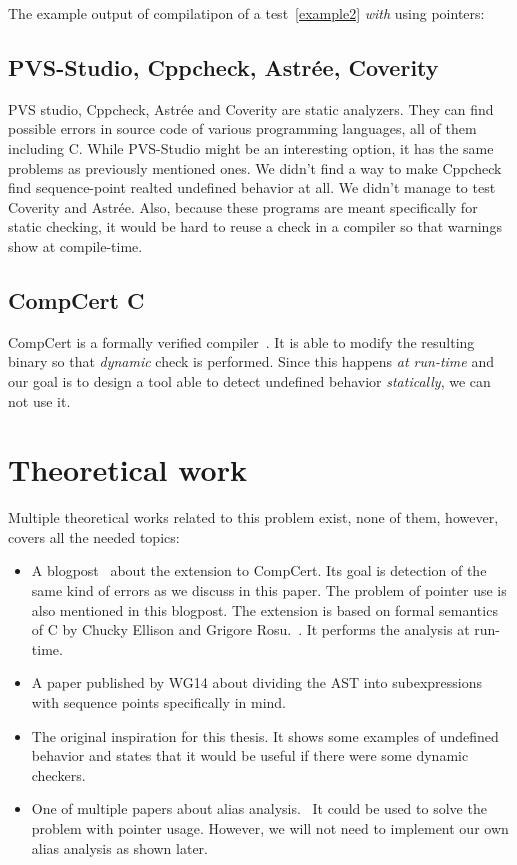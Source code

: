 The example output of compilatipon of a test~\ref{example2} \emph{with} using pointers:
\\

\subsection{PVS-Studio, Cppcheck, Astrée, Coverity}
PVS studio, Cppcheck, Astrée and Coverity are static analyzers. They can find possible errors in source code of various programming languages, all of them including C. While PVS-Studio might be an interesting option, it has the same problems as previously mentioned ones. We didn't find a way to make Cppcheck find sequence-point realted undefined behavior at all. We didn't manage to test Coverity and Astrée. Also, because these programs are meant specifically for static checking, it would be hard to reuse a check in a compiler so that warnings show at compile-time.
\subsection{CompCert C}
CompCert is a formally verified compiler~\cite{CompCert}. It is able to modify the resulting binary so that \emph{dynamic} check is performed. Since this happens \emph{at run-time} and our goal is to design a tool able to detect undefined behavior \emph{statically}, we can not use it.
\section{Theoretical work}
Multiple theoretical works related to this problem exist, none of them, however, covers all the needed topics:
\begin{itemize}
\item A blogpost~\cite{CompCertBlogpost} about the extension to CompCert. Its goal is detection of the same kind of errors as we discuss in this paper. The problem of pointer use is also mentioned in this blogpost. The extension is based on formal semantics of C by Chucky Ellison and Grigore Rosu.~\cite{formalSemantics}. It performs the analysis at run-time.
\item A paper published by WG14 about dividing the AST into subexpressions with sequence points specifically in mind.~\cite{seqPointWG14}
\item The original inspiration for this thesis. It shows some examples of undefined behavior and states that it would be useful if there were some dynamic checkers.~\cite{regehr}
\item One of multiple papers about alias analysis.~\cite{steensgaard} It could be used to solve the problem with pointer usage. However, we will not need to implement our own alias analysis as shown later.
\end{itemize}
